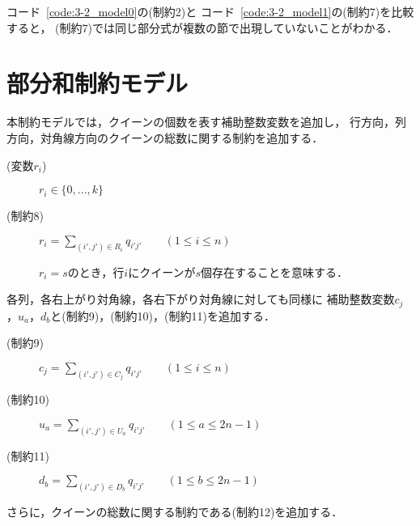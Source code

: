 コード~\ref{code:3-2_model0}の(制約2)と
コード~\ref{code:3-2_model1}の(制約7)を比較すると，
(制約7)では同じ部分式が複数の節で出現していないことがわかる．




\newpage
\section{部分和制約モデル}
本制約モデルでは，クイーンの個数を表す補助整数変数を追加し，
行方向，列方向，対角線方向のクイーンの総数に関する制約を追加する．
\begin{description}
 \item[(変数$r_i$)] $r_{i} \in \{0,...,k\}$ 
 \item[(制約8)] $r_{i} = \sum\limits _{(i',j') \in R_{i}} q_{i'j'} \qquad (1 \leq i \leq n)$ \par
$r_i = s$のとき，行$i$にクイーンが$s$個存在することを意味する．
\end{description}
%
各列，各右上がり対角線，各右下がり対角線に対しても同様に
補助整数変数$c_j$，$u_{a}$，$d_{b}$と(制約9)，(制約10)，(制約11)を追加する．
%
\begin{description}
 \item[(制約9)] $c_{j} = \sum\limits _{(i',j') \in C_{j}} 
q_{i'j'} \qquad (1 \leq i \leq n)$
 \item[(制約10)] $u_{a} = \sum\limits _{(i',j') \in U_{a}} 
q_{i'j'}\qquad (1 \leq a \leq 2n-1)$
 \item[(制約11)] $d_{b} = \sum\limits _{(i',j') \in D_{b}} 
q_{i'j'} \qquad(1 \leq b \leq 2n-1)$
\end{description}
さらに，クイーンの総数に関する制約である(制約12)を追加する．
